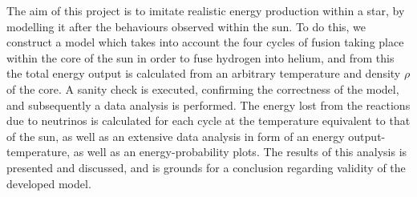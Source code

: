 \documentclass[10pt, nofootinbib, twocolumn]{revtex4-1}
\begin{document}
The aim of this project is to imitate realistic energy production within a star, by modelling it after the behaviours observed within the sun. To do this, we construct a model which takes into account the four cycles of fusion taking place within the core of the sun in order to fuse hydrogen into helium, and from this the total energy output is calculated from an arbitrary temperature and density $\rho$ of the core. A sanity check is executed, confirming the correctness of the model, and subsequently a data analysis is performed. The energy lost from the reactions due to neutrinos is calculated for each cycle at the temperature equivalent to that of the sun, as well as an extensive data analysis in form of an energy output-temperature, as well as an energy-probability plots. The results of this analysis is presented and discussed, and is grounds for a conclusion regarding validity of the developed model.



\end{document}
